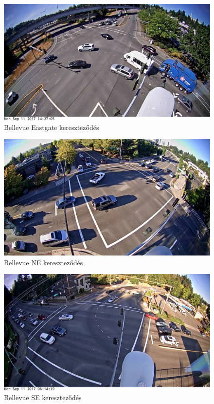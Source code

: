 \documentclass[acmtog, authorversion]{acmart}
\begin{document}
\begin{figure}
    \includegraphics[width=1\columnwidth]{dataset_samples/Bellevue_150th_Eastgate.JPG}
    \caption{Bellevue Eastgate kereszteződés}
    \label{fig: BellevueEastgate}
\end{figure}
\begin{figure}
    \includegraphics[width=1\columnwidth]{dataset_samples/Bellevue_116th_NE12th.JPG}
    \caption{Bellevue NE kereszteződés}
    \label{fig: BellevueNE}
\end{figure}
\begin{figure}
    \includegraphics[width=1\columnwidth]{dataset_samples/Bellevue_150th_SE38th.JPG}
    \caption{Bellevue SE kereszteződés}
    \label{fig: BellevueSE}
\end{figure}
\end{document}
